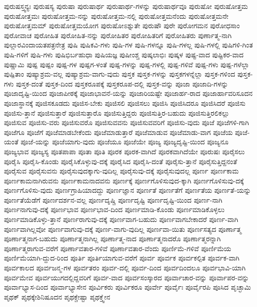 {ಪುರುಷಸ್ತ್ವನ್ಯಃ
ಪುರುಷಸ್ಯ
ಪುರುಷಾ
ಪುರುಷಾರ್ಥ
ಪುರುಷಾರ್ಥ-ಗಳನ್ನು
ಪುರುಷಾರ್ಥವೂ
ಪುರುಷೋ
ಪುರುಷೋತ್ತಮ
ಪುರುಷೋತ್ತಮಃ
ಪುರುಷೋತ್ತಮ-ನನ್ನು
ಪುರುಷೋತ್ತಮ-ನಲ್ಲಿ
ಪುರುಷೋತ್ತಮನೆಂದು
ಪುರುಷೋತ್ತಮನೇ
ಪುರುಷೋತ್ತಮಮ್
ಪುರುಷೋತ್ತಮಯೋಗ
ಪುರುಷೋಽಶ್ನುತೇ
ಪುರುಷೌ
ಪುರೇ
ಪುರೋಗಮನ
ಪುರೋಧಸಾಂ
ಪುರೋವಾಚ
ಪುರೋಹಿತ
ಪುರೋಹಿತ-ನನ್ನು
ಪುರೋಹಿತರ
ಪುರೋಹಿತರಿಗೆ
ಪುರೋಹಿತರು
ಪುರ್ಣಾತ್ಮ-ನಾಗಿ
ಪುಲ್ಲಾರವಿಂದಾಯತಪತ್ರನೇತ್ರ
ಪುಷಿ
ಪುಷಿಕವಿ-ಗಳು
ಪುಷಿ-ಗಳ
ಪುಷಿ-ಗಳನ್ನೂ
ಪುಷಿ-ಗಳಲ್ಲ
ಪುಷಿ-ಗಳಲ್ಲಿ
ಪುಷಿಗಳಿ-ಗಿಂತ
ಪುಷಿ-ಗಳಿಗೆ
ಪುಷಿ-ಗಳು
ಪುಷಿಭಿರ್ಬಹುಧಾ
ಪುಷಿಯಜ್ಞ
ಪುಷೀಂಶ್ಚ
ಪುಷ್ಕಲಾಭಿಃ
ಪುಷ್ಕಳ
ಪುಷ್ಟ-ವಾದ
ಪುಷ್ಟಿಕರ-ವಾದ
ಪುಷ್ಣಾಮಿ
ಪುಷ್ಪ
ಪುಷ್ಪಂ
ಪುಷ್ಪ-ಗಳ
ಪುಷ್ಪಗ-ಳಂತೆ
ಪುಷ್ಪ-ಗಳನ್ನು
ಪುಷ್ಪ-ಗಳಲ್ಲಿ
ಪುಷ್ಪ-ಗಳಿವೆ
ಪುಷ್ಪ-ಗಳು
ಪುಷ್ಪ-ಗಳೆಲ್ಲಾ
ಪುಷ್ಪಿತಾಂ
ಪುಷ್ಯಾಶ್ರಮ-ವಲ್ಲ
ಪುಷ್ಯಾಶ್ರಮ-ವಾಗು-ವುದು
ಪುಸ್ತಕ
ಪುಸ್ತಕ-ಗಳನ್ನು
ಪುಸ್ತಕಗಳನ್ನೆಲ್ಲಾ
ಪುಸ್ತಕ-ಗಳಿಂದ
ಪುಸ್ತಕ-ಗಳು
ಪುಸ್ತಕ-ದಂತೆ
ಪುಸ್ತಕ-ದಿಂದ
ಪುಸ್ತಕರೂಪಕ್ಕೆ
ಪುಸ್ತಕರೂಪ-ದಲ್ಲಿ
ಪುಸ್ತಕ-ವನ್ನು
ಪೂಜಾ
ಪೂಜಾದಿ-ಗಳನ್ನು
ಪೂಜಾದೃಷ್ಟಿ-ಯಿಂದ
ಪೂಜಾಪೀಠಕ್ಕೆ
ಪೂಜಾಭಾವನೆ-ಯನ್ನು
ಪೂಜಾರಿಯಷ್ಟೇ
ಪೂಜಾರ್ಹ-ರಾದ
ಪೂಜಾರ್ಹಾವರಿಸೂದನ
ಪೂಜಾಸ್ಥಾನಕ್ಕೆ
ಪೂಜಿಸಕೂಡದು
ಪೂಜಿಸ-ಬೇಕು
ಪೂಜಿಸಲಿ
ಪೂಜಿಸಲು
ಪೂಜಿಸಿ
ಪೂಜಿಸಿದರೂ
ಪೂಜಿಸಿದರೆ
ಪೂಜಿಸು
ಪೂಜಿಸು-ತ್ತಾನೆ
ಪೂಜಿಸುತ್ತಾರೆ
ಪೂಜಿಸುತ್ತಾರೊ
ಪೂಜಿಸುತ್ತಿದ್ದರು
ಪೂಜಿಸುತ್ತಿರ-ಬಹುದು
ಪೂಜಿಸುತ್ತಿರಲಿಕಲ್ಲು
ಪೂಜಿಸುವ
ಪೂಜಿಸು-ವರು
ಪೂಜಿಸುವರೊ
ಪೂಜಿಸುವವನು
ಪೂಜಿಸುವವರಿಗೆ
ಪೂಜಿಸು-ವುದು
ಪೂಜೆ
ಪೂಜೆಗಳಿ-ಗಾಗಿ
ಪೂಜೆಗೂ
ಪೂಜೆಗೆ
ಪೂಜೆಮಾಡಬೇಕೆಂದು
ಪೂಜೆಮಾಡುತ್ತಾರೆ
ಪೂಜೆಮಾಡುವ
ಪೂಜೆಮಾಡು-ವಾಗ
ಪೂಜೆಯ
ಪೂಜೆ-ಯಂತೆ
ಪೂಜೆ-ಯನ್ನು
ಪೂಜೆಯಾಗು-ವುದು
ಪೂಜೆಯೂ
ಪೂಜೆಯೇ
ಪೂಜ್ಯ
ಪೂಜ್ಯದೃಷ್ಟಿ-ಯಿಂದ
ಪೂಜ್ಯನೂ
ಪೂಜ್ಯಭಾವ
ಪೂಜ್ಯಸ್ಯ
ಪೂತಪಾಪಾ
ಪೂತಾ
ಪೂತಿ
ಪೂರಕ
ಪೂರಕ-ವಾಗಿದೆ
ಪೂರಕವಾಗಿದೆಯೇ
ಪೂರುಷಃ
ಪೂರೈಸಲು
ಪೂರೈಸಿ
ಪೂರೈಸಿ-ಕೊಂಡು
ಪೂರೈಸಿಕೊಳ್ಳುವು-ದಕ್ಕೆ
ಪೂರೈಸಿದ
ಪೂರೈಸಿ-ದಂತೆ
ಪೂರೈಸು-ತ್ತಾನೆ
ಪೂರೈಸುತ್ತಿದ್ದನಂತೆ
ಪೂರೈಸುವ
ಪೂರೈಸುವನು
ಪೂರೈಸುವುದಕ್ಕಾಗು-ವುದಿಲ್ಲ
ಪೂರೈಸುವು-ದಕ್ಕೆ
ಪೂರೈಸುವುದಲ್ಲ
ಪೂರ್ಣ
ಪೂರ್ಣಕಾಮ
ಪೂರ್ಣಕಾಮನಾಗಿರುವನು
ಪೂರ್ಣಕಾಮನಾದವನು
ಪೂರ್ಣಕ್ಕೆ
ಪೂರ್ಣಗೊಳಿಸುವುದ-ಕ್ಕಾಗಿ
ಪೂರ್ಣಗೊಳಿಸುವು-ದಕ್ಕೆ
ಪೂರ್ಣಗೊಳಿಸು-ವುದು
ಪೂರ್ಣಗ್ರಾಹಿಯಾದದ್ದು
ಪೂರ್ಣಜ್ಞಾನ
ಪೂರ್ಣತೆ
ಪೂರ್ಣತೆಗೆ
ಪೂರ್ಣತೆಯ
ಪೂರ್ಣತೆ-ಯನ್ನು
ಪೂರ್ಣತೆಯೆಡೆಗೆ
ಪೂರ್ಣದರ್ಶನ-ವಲ್ಲ
ಪೂರ್ಣದೃಷ್ಚಿ
ಪೂರ್ಣದೃಷ್ಟಿ
ಪೂರ್ಣದೃಷ್ಟಿ-ಯಿಂದ
ಪೂರ್ಣ-ನಾಗಿ
ಪೂರ್ಣನಾಗುವು-ದಕ್ಕೆ
ಪೂರ್ಣಭಾವ
ಪೂರ್ಣಭಾವ-ದಿಂದ
ಪೂರ್ಣಮಾಡಿ-ಕೊಂಡು
ಪೂರ್ಣಮಾಡಿಕೊಳ್ಳಲು
ಪೂರ್ಣಮಾಡಿಕೊಳ್ಳು-ತ್ತಾನೆ
ಪೂರ್ಣರಾಗುವು-ದಕ್ಕೆ
ಪೂರ್ಣವಾಗ-ಬಹುದು
ಪೂರ್ಣವಾಗಬೇಕಾದರೆ
ಪೂರ್ಣ-ವಾಗಿ
ಪೂರ್ಣವಾಗಿಲ್ಲವೋ
ಪೂರ್ಣವಾಗುವು-ದಕ್ಕೆ
ಪೂರ್ಣ-ವಾಗು-ವುದಿಲ್ಲ
ಪೂರ್ಣವಾ-ಯಿತು
ಪೂರ್ಣಸತ್ಯದ
ಪೂರ್ಣಾತ್ಮ
ಪೂರ್ಣಾತ್ಮನಾಗ-ಬಹುದು
ಪೂರ್ಣಾತ್ಮನಾಗಿಲ್ಲ
ಪೂರ್ಣಾತ್ಮ-ನಾದ
ಪೂರ್ಣಾತ್ಮನಾದರೊ
ಪೂರ್ಣಾತ್ಮರನ್ನಾಗಿ
ಪೂರ್ಣಾತ್ಮರಾಗುವ-ವರೆಗೆ
ಪೂರ್ಣಾವತಾರ-ಗಳಿವೆ
ಪೂರ್ಣಾವತಾರ-ವೆಂದು
ಪೂರ್ಣಿಮೆ-ಗಳಿವೆ
ಪೂರ್ಣಿಮೆಯ
ಪೂರ್ಣಿಮೆಯಾಗಿ-ದ್ದುದ-ರಿಂದ
ಪೂರ್ತಿ
ಪೂರ್ತಿಯಾಗುವ-ವರೆಗೆ
ಪೂರ್ವ
ಪೂರ್ವಕ
ಪೂರ್ವಕಲ್ಪಿತ
ಪೂರ್ವಕ-ವಾಗಿ
ಪೂರ್ವಕಾಲದ
ಪೂರ್ವಜನ್ಮ-ಗಳ
ಪೂರ್ವತರಂ
ಪೂರ್ವ-ದಲ್ಲಿ
ಪೂರ್ವ-ದಿಂದ
ಪೂರ್ವದಿಂದಲೂ
ಪೂರ್ವಭಾವಿ-ಯಾಗಿ
ಪೂರ್ವಮೇವ
ಪೂರ್ವಯುಗದಲ್ಲಿದ್ದವರಿಗೆ
ಪೂರ್ವ-ವಾದ
ಪೂರ್ವಸಂಸ್ಕಾರದ
ಪೂರ್ವಾಚಾರ-ವನ್ನು
ಪೂರ್ವಾಪರ-ವನ್ನು
ಪೂರ್ವಾಭ್ಯಾಸ-ದಿಂದ
ಪೂರ್ವಾಭ್ಯಾಸೇನ
ಪೂರ್ವಿಕರು
ಪೂರ್ವಿಕರೂ
ಪೂರ್ವೇ
ಪೂರ್ವೈಃ
ಪೂರ್ವೈರಪಿ
ಪೂಸಿದ
ಪೃಚ್ಛಾಮಿ
ಪೃಥಕ್
ಪೃಥಕ್ಕೇಶಿನಿಷೂದನ
ಪೃಥಕ್ಚೇಷ್ಟಾ
ಪೃಥಕ್ತ್ವೇನ
}
